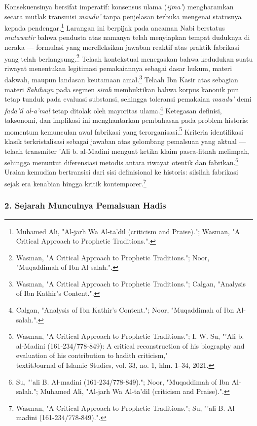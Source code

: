 Konsekuensinya bersifat imperatif: konsensus ulama (\textit{ijma'}) mengharamkan secara mutlak transmisi \textit{maudu'} tanpa penjelasan terbuka mengenai statusnya kepada pendengar.\footnote{Muhamed Ali, "Al-jarh Wa Al-ta'dil (criticism and Praise)."; Wasman, "A Critical Approach to Prophetic Traditions.".} Larangan ini berpijak pada ancaman Nabi berstatus \textit{mutawatir} bahwa pendusta atas namanya telah menyiapkan tempat duduknya di neraka --- formulasi yang merefleksikan jawaban reaktif atas praktik fabrikasi yang telah berlangsung.\footnote{Wasman, "A Critical Approach to Prophetic Traditions."; Noor, "Muqaddimah of Ibn Al-salah.".} Telaah kontekstual menegaskan bahwa kedudukan suatu riwayat menentukan legitimasi pemakaiannya sebagai dasar hukum, materi dakwah, maupun landasan keutamaan amal.\footnote{Wasman, "A Critical Approach to Prophetic Traditions."; Calgan, "Analysis of Ibn Kathir's Content.".} Telaah Ibn Kasir atas sebagian materi \textit{Sahihayn} pada segmen \textit{sirah} membuktikan bahwa korpus kanonik pun tetap tunduk pada evaluasi substansi, sehingga toleransi pemakaian \textit{maudu'} demi \textit{fada'il al-a'mal} tetap ditolak oleh mayoritas ulama.\footnote{Calgan, "Analysis of Ibn Kathir's Content."; Noor, "Muqaddimah of Ibn Al-salah.".} Ketegasan definisi, taksonomi, dan implikasi ini menghantarkan pembahasan pada problem historis: momentum kemunculan awal fabrikasi yang terorganisasi.\footnote{Wasman, "A Critical Approach to Prophetic Traditions."; I.-W. Su, "'Ali b. al-Madini (161-234/778-849): A critical reconstruction of his biography and evaluation of his contribution to hadith criticism," \\textit{Journal of Islamic Studies}, vol. 33, no. 1, hlm. 1--34, 2021.} Kriteria identifikasi klasik terkristalisasi sebagai jawaban atas gelombang pemalsuan yang aktual --- telaah transmiter 'Ali b. al-Madini menguat ketika klaim pasca-fitnah melimpah, sehingga menuntut diferensiasi metodis antara riwayat otentik dan fabrikan.\footnote{Su, "'ali B. Al-madini (161-234/778-849)."; Noor, "Muqaddimah of Ibn Al-salah."; Muhamed Ali, "Al-jarh Wa Al-ta'dil (criticism and Praise).".} Uraian kemudian bertransisi dari sisi definisional ke historis: silsilah fabrikasi sejak era kenabian hingga kritik kontemporer.\footnote{Wasman, "A Critical Approach to Prophetic Traditions."; Su, "'ali B. Al-madini (161-234/778-849).".}

\subsubsection*{2. Sejarah Munculnya Pemalsuan Hadis}

